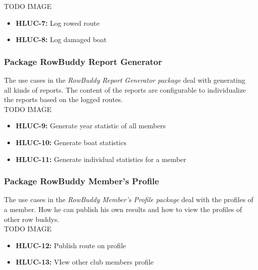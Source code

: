 		TODO IMAGE
		\begin{itemize}
			\item \textbf{HLUC-7:} Log rowed route
			\item \textbf{HLUC-8:} Log damaged boat
		\end{itemize}
		
		\subsubsection{Package RowBuddy Report Generator}
		The use cases in the \textit{RowBuddy Report Generator package} deal with generating all kinds of reports. The content of the reports are configurable to individualize the reports based on the logged routes.\\
				
		TODO IMAGE
		\begin{itemize}
			\item \textbf{HLUC-9:} Generate year statistic of all members
			\item \textbf{HLUC-10:} Generate boat statistics
			\item \textbf{HLUC-11:} Generate individual statistics for a member
		\end{itemize}
		
		
		\subsubsection{Package RowBuddy Member's Profile}
		The use cases in the \textit{RowBuddy Member's Profile package} deal with the profiles of a member. How he can publish his own results and how to view the profiles of other row buddys.\\
		
		TODO IMAGE
		\begin{itemize}
			\item \textbf{HLUC-12:} Publish route on profile
			\item \textbf{HLUC-13:} VIew other club members profile
		\end{itemize}
		